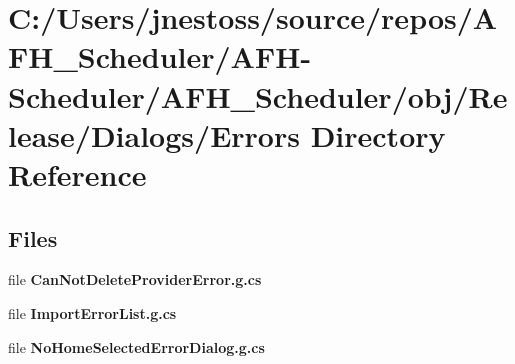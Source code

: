 \section{C\+:/\+Users/jnestoss/source/repos/\+A\+F\+H\+\_\+\+Scheduler/\+A\+F\+H-\/\+Scheduler/\+A\+F\+H\+\_\+\+Scheduler/obj/\+Release/\+Dialogs/\+Errors Directory Reference}
\label{dir_c4ae46ef646c207ffffb5447e27cffb6}
\subsection*{Files}
\begin{DoxyCompactItemize}
\item 
file \textbf{ Can\+Not\+Delete\+Provider\+Error.\+g.\+cs}
\item 
file \textbf{ Import\+Error\+List.\+g.\+cs}
\item 
file \textbf{ No\+Home\+Selected\+Error\+Dialog.\+g.\+cs}
\end{DoxyCompactItemize}
